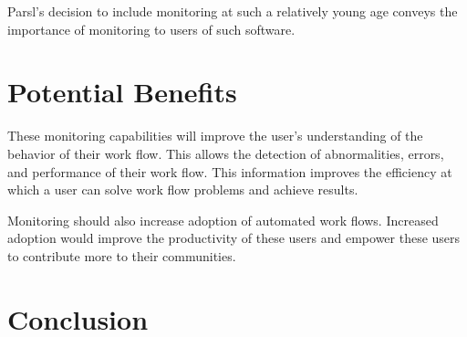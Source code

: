 \documentclass{article}
\begin{document}
Parsl's decision to include monitoring at such a relatively young age conveys the importance of monitoring to users of such software.

\section{Potential Benefits}
These monitoring capabilities will improve the user's understanding of the behavior of their work flow.
This allows the detection of abnormalities, errors, and performance of their work flow.
This information improves the efficiency at which a user can solve work flow problems and achieve results.

Monitoring should also increase adoption of automated work flows.
Increased adoption would improve the productivity of these users and empower these users to contribute more to their communities.

\section{Conclusion}




\end{document}
